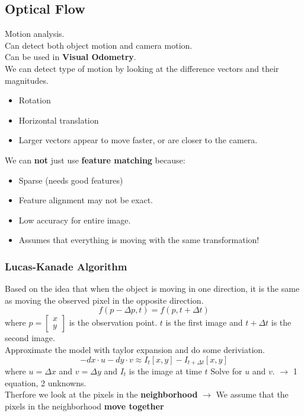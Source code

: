 \documentclass[a4paper]{article}
\begin{document}
\newpage
\subsection{Optical Flow}
Motion analysis.\\
Can detect both object motion and camera motion. \\
Can be used in \textbf{Visual Odometry}.\\
We can detect type of motion by looking at the difference vectors and their magnitudes. 
\begin{itemize}
	\item Rotation
	\item Horizontal translation
	\item Larger vectors appear to move faster, or are closer to the camera. 
\end{itemize}
We can \textbf{not} just use \textbf{feature matching} because:
\begin{itemize}
	\item Sparse (needs good features)
	\item Feature alignment may not be exact. 
	\item Low accuracy for entire image. 
	\item Assumes that everything is moving with the same transformation!
\end{itemize}

\subsubsection{Lucas-Kanade Algorithm}
Based on the idea that when the object is moving in one direction, it is the same as moving the observed pixel in the opposite direction.
\begin{equation}
f(p-\Delta p, t) = f(p, t+ \Delta t)
\end{equation}
where $ p = \begin{bmatrix}
x \\
y
\end{bmatrix} $ is the observation point. $ t $ is the first image and $ t + \Delta t $ is the second image. \\
Approximate the model with taylor expansion and do some deriviation. 
\begin{equation} \label{eq:approximate_linearized_model}
	-d x \cdot  u - d y \cdot v \approx I_t[x,y] - I_{t+\Delta t}[x,y]
\end{equation}
where $ u = \Delta x$ and $ v = \Delta y $ and  $ I_t $ is the image at time $ t $
Solve for $ u $ and $ v $. $ \rightarrow $ 1 equation, 2 unknowns.\\
Therfore we look at the pixels in the \textbf{neighborhood}  $ \rightarrow $  We assume that the pixels in the neighborhood \textbf{move together} 
\end{document}
